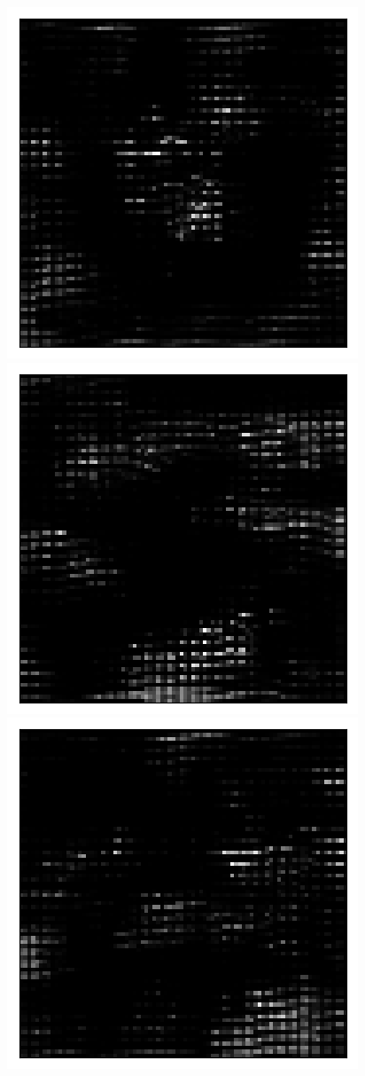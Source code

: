 \begin{figure}[h!]
\centering
\captionsetup{justification=centering}
\begin{multicols}{4}
    \includegraphics[scale=0.4]{figures/results/latent_image/beta_1_prior_sample_0.png}
    \includegraphics[scale=0.4]{figures/results/latent_image/beta_1_prior_sample_1.png}
    \includegraphics[scale=0.4]{figures/results/latent_image/beta_1_prior_sample_2.png}

\end{multicols}
\end{figure}
